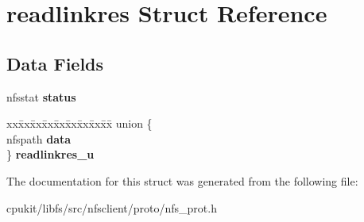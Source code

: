 \hypertarget{structreadlinkres}{}\section{readlinkres Struct Reference}
\label{structreadlinkres}
\subsection*{Data Fields}
\begin{DoxyCompactItemize}
\item 
\mbox{\label{structreadlinkres_a4fdadf1680b21c7798938fb32be5c95a}} 
nfsstat {\bfseries status}
\item 
\mbox{\label{structreadlinkres_af4864546fc8ea545ddd6a5dd215afcce}} 
\begin{tabbing}
xx\=xx\=xx\=xx\=xx\=xx\=xx\=xx\=xx\=\kill
union \{\\
\>nfspath {\bfseries data}\\
\} {\bfseries readlinkres\_u}\\

\end{tabbing}\end{DoxyCompactItemize}


The documentation for this struct was generated from the following file\+:\begin{DoxyCompactItemize}
\item 
cpukit/libfs/src/nfsclient/proto/nfs\+\_\+prot.\+h\end{DoxyCompactItemize}
